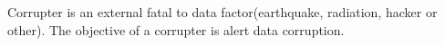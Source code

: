 Corrupter is an external fatal to data factor(earthquake, radiation, hacker or other). The objective of a corrupter is alert data corruption.
